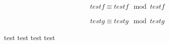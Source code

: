 
\begin{eqnarray*}
testf \equiv testf \mod testf
\end{eqnarray*}

\begin{eqnarray}
testg \equiv testg \mod testg
\end{eqnarray}

test test test test
